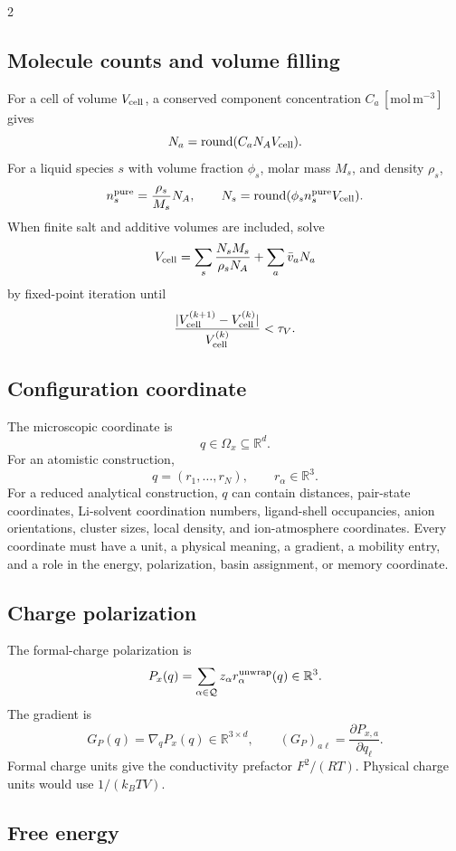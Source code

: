 \documentclass[10pt]{article}
\begin{document}
\begin{multicols}{2}
\subsection{Molecule counts and volume filling}

For a cell of volume \(V_{\rm cell}\), a conserved component concentration
\(C_a\,[\mathrm{mol\,m^{-3}}]\) gives
\[
N_a=\operatorname{round}(C_aN_AV_{\rm cell}).
\]
For a liquid species \(s\) with volume fraction \(\phi_s\), molar mass \(M_s\),
and density \(\rho_s\),
\[
n_s^{\rm pure}=\frac{\rho_s}{M_s}N_A,
\qquad
N_s=\operatorname{round}(\phi_sn_s^{\rm pure}V_{\rm cell}).
\]
When finite salt and additive volumes are included, solve
\[
V_{\rm cell}
=
\sum_s\frac{N_sM_s}{\rho_sN_A}
+
\sum_a\bar v_aN_a
\]
by fixed-point iteration until
\[
\frac{|V_{\rm cell}^{(k+1)}-V_{\rm cell}^{(k)}|}
{V_{\rm cell}^{(k)}}<\tau_V.
\]

\subsection{Configuration coordinate}

The microscopic coordinate is
\[
q\in\Omega_x\subseteq\mathbb R^d.
\]
For an atomistic construction,
\[
q=(r_1,\ldots,r_N),
\qquad
r_\alpha\in\mathbb R^3.
\]
For a reduced analytical construction, \(q\) can contain distances, pair-state
coordinates, Li-solvent coordination numbers, ligand-shell occupancies, anion
orientations, cluster sizes, local density, and ion-atmosphere coordinates.
Every coordinate must have a unit, a physical meaning, a gradient, a mobility
entry, and a role in the energy, polarization, basin assignment, or memory
coordinate.

\subsection{Charge polarization}

The formal-charge polarization is
\[
P_x(q)
=
\sum_{\alpha\in\mathcal Q}
z_\alpha r_\alpha^{\rm unwrap}(q)
\in\mathbb R^3.
\]
The gradient is
\[
G_P(q)=\nabla_qP_x(q)\in\mathbb R^{3\times d},
\qquad
(G_P)_{a\ell}=\frac{\partial P_{x,a}}{\partial q_\ell}.
\]
Formal charge units give the conductivity prefactor \(F^2/(RT)\). Physical
charge units would use \(1/(k_BT V)\).

\subsection{Free energy}
\label{sec:forcefield}


\end{multicols}
\end{document}
